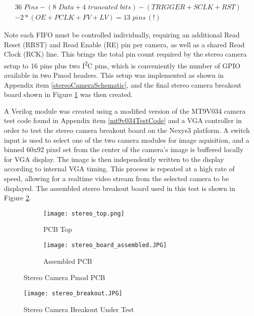\begin{equation}
\label{lowerPincount}
\begin{split}
36\,\, Pins - (8\,\,Data + 4 \,\,truncated\,\,bits) - (TRIGGER+SCLK+RST) \\ - 2*(OE+PCLK+FV+LV) = 13\,\,pins\,(!) 
\end{split}
\end{equation}
\par
Note each FIFO must be controlled individually, requiring an additional Read Reset (RRST) and Read Enable (RE) pin per camera, as well as a shared Read Clock (RCK) line. This brings the total pin count required by the stereo camera setup to 16 pins plus two I\textsuperscript{2}C pins, which is conveniently the number of GPIO available in two Pmod headers. This setup was implemented as shown in Appendix item \ref{stereoCameraSchematic}, and the final stereo camera breakout board shown in Figure \ref{stereoCameraBoard} was then created.  
\par
A Verilog module was created using a modified version of the MT9V034 camera test code found in Appendix item \ref{mt9v034TestCode} and a VGA controller in order to test the stereo camera breakout board on the Nexys3 platform. A switch input is used to select one of the two camera modules for image aquisition, and a binned 60x92 pixel set from the center of the camera's image is buffered locally for VGA display. The image is then independently written to the display according to internal VGA timing. This process is repeated at a high rate of speed, allowing for a realtime video stream from the selected camera to be displayed. The assembled stereo breakout board used in this test is shown in Figure \ref{stereoTestSetup}.
\begin{figure}[H] 
	\begin{subfigure}{1\textwidth}
	\centering
		\texttt{[image: stereo\_top.png]}
		\caption{PCB Top}
	\end{subfigure}
	\begin{subfigure}{1\textwidth}
	\centering
		\texttt{[image: stereo\_board\_assembled.JPG]}
		\caption{Assembled PCB}
	\end{subfigure}
	\caption{Stereo Camera Pmod PCB}
	\label{stereoCameraBoard}
\end{figure}
\par
\begin{figure}[H] 
	\centering
	\texttt{[image: stereo\_breakout.JPG]}
	\caption{Stereo Camera Breakout Under Test}
	\label{stereoTestSetup}
\end{figure}
